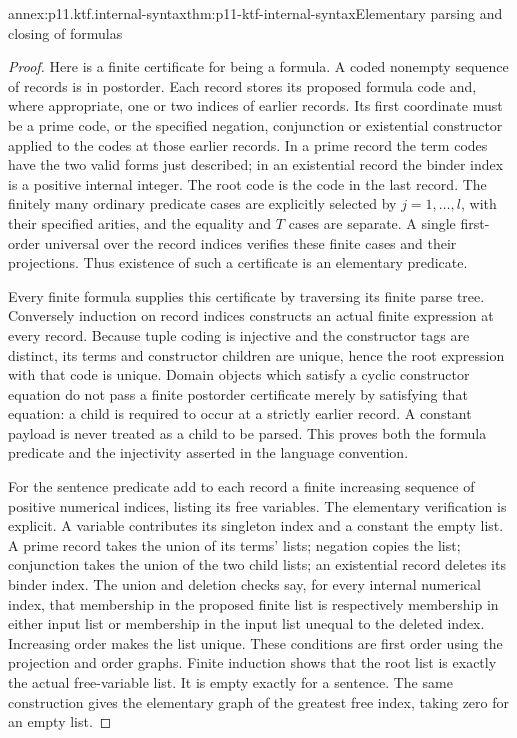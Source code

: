 \begin{annexitem}{annex:p11.ktf.internal-syntax}{thm:p11-ktf-internal-syntax}{Elementary parsing and closing of formulas}
\begin{proof}
Here is a finite certificate for being a formula. A coded nonempty
sequence of records is in postorder. Each record stores its proposed
formula code and, where appropriate, one or two indices of earlier
records. Its first coordinate must be a prime code, or the specified
negation, conjunction or existential constructor applied to the codes
at those earlier records. In a prime record the term codes have the
two valid forms just described; in an existential record the binder
index is a positive internal integer. The root code is the code in
the last record. The finitely many ordinary predicate cases are
explicitly selected by \(j=1,\ldots,l\), with their specified
arities, and the equality and \(T\) cases are separate. A single
first-order universal over the record indices verifies these finite
cases and their projections. Thus existence of such a certificate
is an elementary predicate.

Every finite formula supplies this certificate by traversing its
finite parse tree. Conversely induction on record indices constructs
an actual finite expression at every record. Because tuple coding
is injective and the constructor tags are distinct, its terms and
constructor children are unique, hence the root expression with that
code is unique. Domain objects which satisfy a cyclic constructor
equation do not pass a finite postorder certificate merely by satisfying
that equation: a child is required to occur at a strictly earlier
record. A constant payload is never treated as a child to be parsed.
This proves both the formula predicate and the injectivity asserted
in the language convention.

For the sentence predicate add to each record a finite increasing
sequence of positive numerical indices, listing its free variables.
The elementary verification is explicit. A variable contributes its
singleton index and a constant the empty list. A prime record takes
the union of its terms' lists; negation copies the list; conjunction
takes the union of the two child lists; an existential record deletes
its binder index. The union and deletion checks say, for every
internal numerical index, that membership in the proposed finite
list is respectively membership in either input list or membership
in the input list unequal to the deleted index. Increasing order
makes the list unique. These conditions are first order using the
projection and order graphs. Finite induction shows that the root
list is exactly the actual free-variable list. It is empty exactly
for a sentence. The same construction gives the elementary graph
of the greatest free index, taking zero for an empty list.


\end{proof}
\end{annexitem}
